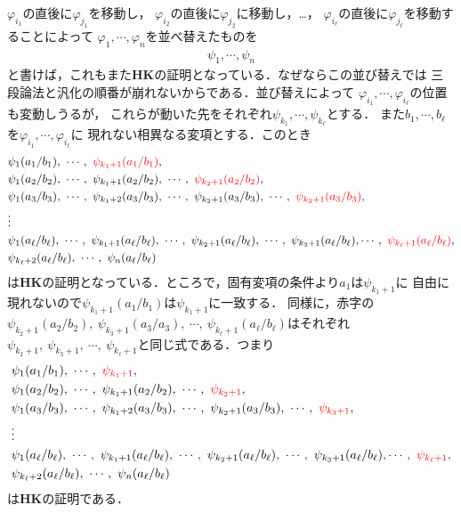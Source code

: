\begin{metaprf}
		$\varphi_{i_{1}}$の直後に$\varphi_{j_{1}}$を移動し，
		$\varphi_{i_{2}}$の直後に$\varphi_{j_{2}}$に移動し，…，
		$\varphi_{i_{\ell}}$の直後に$\varphi_{j_{\ell}}$を移動することによって
		$\varphi_{1},\cdots,\varphi_{n}$を並べ替えたものを
		\begin{align}
			\psi_{1},\cdots,\psi_{n}
		\end{align}
		と書けば，これもまた{\bf HK}の証明となっている．なぜならこの並び替えでは
		三段論法と汎化の順番が崩れないからである．並び替えによって
		$\varphi_{i_{1}},\cdots,\varphi_{i_{\ell}}$の位置も変動しうるが，
		これらが動いた先をそれぞれ$\psi_{k_{1}},\cdots,\psi_{k_{\ell}}$とする．
		また$b_{1},\cdots,b_{\ell}$を$\varphi_{i_{1}},\cdots,\varphi_{i_{\ell}}$に
		現れない相異なる変項とする．このとき
		\begin{align}
			&\psi_{1}(a_{1}/b_{1}),\ \cdots,\ \textcolor{red}{\psi_{k_{1}+1}(a_{1}/b_{1})}, \\
			&\psi_{1}(a_{2}/b_{2}),\ \cdots,\ \psi_{k_{1}+1}(a_{2}/b_{2}),\ \cdots,\ \textcolor{red}{\psi_{k_{2}+1}(a_{2}/b_{2})}, \\
			&\psi_{1}(a_{3}/b_{3}),\ \cdots,\ \psi_{k_{1}+2}(a_{3}/b_{3}),\ \cdots,\ \psi_{k_{2}+1}(a_{3}/b_{3}),\ \cdots,\ \textcolor{red}{\psi_{k_{3}+1}(a_{3}/b_{3})}, \\
			&\vdots \\
			&\psi_{1}(a_{\ell}/b_{\ell}),\ \cdots,\ \psi_{k_{1}+1}(a_{\ell}/b_{\ell}),\ \cdots,\ \psi_{k_{2}+1}(a_{\ell}/b_{\ell}),\ \cdots,\ 
			\psi_{k_{3}+1}(a_{\ell}/b_{\ell}), \cdots,\ \textcolor{red}{\psi_{k_{\ell}+1}(a_{\ell}/b_{\ell})}, \\
			&\psi_{k_{\ell}+2}(a_{\ell}/b_{\ell}),\ \cdots,\ \psi_{n}(a_{\ell}/b_{\ell})
		\end{align}
		は{\bf HK}の証明となっている．ところで，固有変項の条件より$a_{1}$は$\psi_{k_{1}+1}$に
		自由に現れないので$\psi_{k_{1}+1}(a_{1}/b_{1})$は$\psi_{k_{1}+1}$に一致する．
		同様に，赤字の$\psi_{k_{2}+1}(a_{2}/b_{2}),\ \psi_{k_{3}+1}(a_{3}/a_{3}),\ 
		\cdots,\ \psi_{k_{\ell}+1}(a_{\ell}/b_{\ell})$はそれぞれ
		$\psi_{k_{2}+1},\ \psi_{k_{3}+1},\ \cdots,\ \psi_{k_{\ell}+1}$と同じ式である．つまり
		\begin{align}
			&\psi_{1}(a_{1}/b_{1}),\ \cdots,\ \textcolor{red}{\psi_{k_{1}+1}}, \\
			&\psi_{1}(a_{2}/b_{2}),\ \cdots,\ \psi_{k_{1}+1}(a_{2}/b_{2}),\ \cdots,\ \textcolor{red}{\psi_{k_{2}+1}}, \\
			&\psi_{1}(a_{3}/b_{3}),\ \cdots,\ \psi_{k_{1}+2}(a_{3}/b_{3}),\ \cdots,\ \psi_{k_{2}+1}(a_{3}/b_{3}),\ \cdots,\ \textcolor{red}{\psi_{k_{3}+1}}, \\
			&\vdots \\
			&\psi_{1}(a_{\ell}/b_{\ell}),\ \cdots,\ \psi_{k_{1}+1}(a_{\ell}/b_{\ell}),\ \cdots,\ \psi_{k_{2}+1}(a_{\ell}/b_{\ell}),\ \cdots,\ 
			\psi_{k_{3}+1}(a_{\ell}/b_{\ell}), \cdots,\ \textcolor{red}{\psi_{k_{\ell}+1}}, \\
			&\psi_{k_{\ell}+2}(a_{\ell}/b_{\ell}),\ \cdots,\ \psi_{n}(a_{\ell}/b_{\ell})
		\end{align}
		は{\bf HK}の証明である．
		

\end{metaprf}
